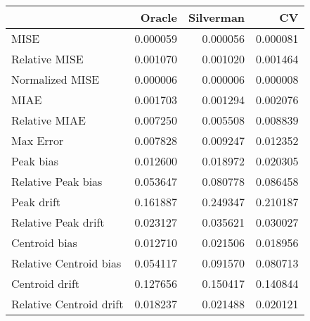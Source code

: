 \begin{tabular}{lrrr}
  \hline
 & Oracle & Silverman & CV \\ 
  \hline
MISE & 0.000059 & 0.000056 & 0.000081 \\ 
  Relative MISE & 0.001070 & 0.001020 & 0.001464 \\ 
  Normalized MISE & 0.000006 & 0.000006 & 0.000008 \\ 
  MIAE & 0.001703 & 0.001294 & 0.002076 \\ 
  Relative MIAE & 0.007250 & 0.005508 & 0.008839 \\ 
  Max Error & 0.007828 & 0.009247 & 0.012352 \\ 
  Peak bias & 0.012600 & 0.018972 & 0.020305 \\ 
  Relative Peak bias & 0.053647 & 0.080778 & 0.086458 \\ 
  Peak drift & 0.161887 & 0.249347 & 0.210187 \\ 
  Relative Peak drift & 0.023127 & 0.035621 & 0.030027 \\ 
  Centroid bias & 0.012710 & 0.021506 & 0.018956 \\ 
  Relative Centroid bias & 0.054117 & 0.091570 & 0.080713 \\ 
  Centroid drift & 0.127656 & 0.150417 & 0.140844 \\ 
  Relative Centroid drift & 0.018237 & 0.021488 & 0.020121 \\ 
   \hline
\end{tabular}
